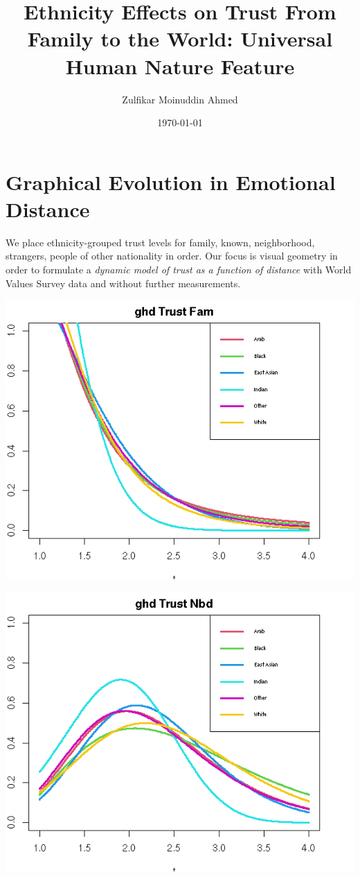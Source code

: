 \documentclass{amsart}
\title{Ethnicity Effects on Trust From Family to the World: Universal Human Nature Feature}
\author{Zulfikar Moinuddin Ahmed}
\date{\today}
\begin{document}
\maketitle

\section{Graphical Evolution in Emotional Distance}

We place ethnicity-grouped trust levels for family, known, neighborhood, strangers, people of other nationality in order.  Our focus is visual geometry in order to formulate a {\em dynamic model of trust as a function of distance} with World Values Survey data and without further measurements.

\includegraphics[scale=0.8]{trfam_fitted.png}

\includegraphics[scale=0.8]{trnbd_fitted.png}
\end{document}
